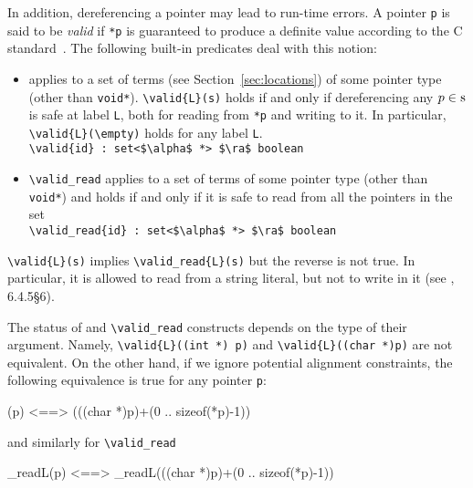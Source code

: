 In addition, dereferencing a pointer may lead to run-time errors. A pointer
\lstinline|p| is said to be \emph{valid} if \lstinline|*p| is guaranteed to
produce a definite value according to the C standard~\cite{standardc99}. The
following built-in predicates deal with this notion:
\begin{itemize}
\item \valid{} applies to a set of terms 
(see Section~\ref{sec:locations}) of some pointer type (other than \lstinline|void*|). 
\lstinline|\valid{L}(s)| holds if and only if
 dereferencing any $p\in \lstinline|s|$ is safe  at label \lstinline|L|, both for reading from 
\lstinline|*p| and writing to it. In particular,
\lstinline|\valid{L}(\empty)| holds for any label \lstinline|L|. 
\\ \makebox[5mm]{} \lstinline|\valid{id} : set<$\alpha$ *> $\ra$ boolean|
\item 
\lstinline|\valid_read|
applies to a set of terms of some pointer type (other than \lstinline|void*|)
and holds if and only if it is safe to read from all the pointers in the set
\\ \makebox[5mm]{} \lstinline|\valid_read{id} : set<$\alpha$ *> $\ra$ boolean|
\end{itemize}

\lstinline|\valid{L}(s)| implies \lstinline|\valid_read{L}(s)| but the reverse is 
not true. In particular, it is allowed to read from a string literal, but not 
to write in it (see \cite{standardc99}, 6.4.5\S6).

The status of \valid and \lstinline|\valid_read| constructs depends on the
type of their argument. Namely, \lstinline|\valid{L}((int *) p)| and 
\lstinline|\valid{L}((char *)p)| are not equivalent. On the other hand, if we 
ignore potential alignment constraints, the following equivalence is true for any pointer \lstinline|p|:
\begin{listing-nonumber}
(p) <==> (((char *)p)+(0 .. sizeof(*p)-1))
\end{listing-nonumber}
and similarly for \lstinline|\valid_read|
\begin{listing-nonumber}
\valid_read{L}(p) <==> \valid_read{L}(((char *)p)+(0 .. sizeof(*p)-1))
\end{listing-nonumber}

